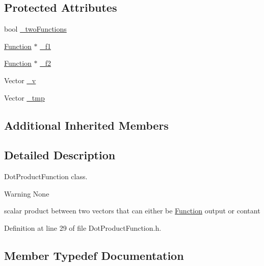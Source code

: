 \subsection*{Protected Attributes}
\begin{DoxyCompactItemize}
\item 
bool \hyperlink{classocra_1_1DotProductFunction_a8450996eff9607045cf57a4502ff0944}{\+\_\+two\+Functions}
\item 
\hyperlink{classocra_1_1Function}{Function} $\ast$ \hyperlink{classocra_1_1DotProductFunction_a3e39a9ce09fc27131afbe8e7a6758681}{\+\_\+f1}
\item 
\hyperlink{classocra_1_1Function}{Function} $\ast$ \hyperlink{classocra_1_1DotProductFunction_a7de350aefad539fdd84453b11019e936}{\+\_\+f2}
\item 
Vector \hyperlink{classocra_1_1DotProductFunction_a6405d1f78159e5fc16801bd73eb32a68}{\+\_\+v}
\item 
Vector \hyperlink{classocra_1_1DotProductFunction_a82d2cb16e4b9b6d50e59fabfb25fc222}{\+\_\+tmp}
\end{DoxyCompactItemize}
\subsection*{Additional Inherited Members}


\subsection{Detailed Description}
Dot\+Product\+Function class. 

\begin{DoxyWarning}{Warning}
None
\end{DoxyWarning}
scalar product between two vectors that can either be \hyperlink{classocra_1_1Function}{Function} output or contant 

Definition at line 29 of file Dot\+Product\+Function.\+h.



\subsection{Member Typedef Documentation}
\hypertarget{classocra_1_1DotProductFunction_abdc60b6380ffedc075792224bd908c48}{}\label{classocra_1_1DotProductFunction_abdc60b6380ffedc075792224bd908c48} 
